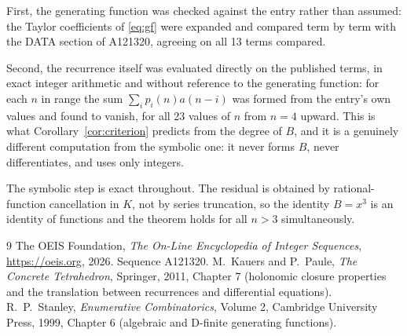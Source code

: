 \documentclass[11pt,a4paper]{article}
\theoremstyle{plain}
\theoremstyle{definition}
\begin{document}
First, the generating function was checked against the entry rather than assumed: the
Taylor coefficients of \eqref{eq:gf} were expanded and compared term by term with the DATA
section of A121320, agreeing on all 13 terms compared.

Second, the recurrence itself was evaluated directly on the published terms, in exact
integer arithmetic and without reference to the generating function: for each $n$ in range
the sum $\sum_{i}p_{i}(n)a(n-i)$ was formed from the entry's own values and found to
vanish, for all 23 values of $n$ from $n=4$ upward. This is what
Corollary~\ref{cor:criterion} predicts from the degree of $B$, and it is a genuinely
different computation from the symbolic one: it never forms $B$, never differentiates, and
uses only integers.

The symbolic step is exact throughout. The residual is obtained by rational-function
cancellation in $K$, not by series truncation, so the identity $B=x^{3}$ is an
identity of functions and the theorem holds for all $n>3$ simultaneously.

\begin{thebibliography}{9}
 The OEIS Foundation, \emph{The On-Line Encyclopedia of Integer Sequences},
\url{https://oeis.org}, 2026. Sequence A121320.
 M.~Kauers and P.~Paule, \emph{The Concrete Tetrahedron}, Springer, 2011,
Chapter 7 (holonomic closure properties and the translation between recurrences and
differential equations).
 R.~P.~Stanley, \emph{Enumerative Combinatorics}, Volume 2, Cambridge
University Press, 1999, Chapter 6 (algebraic and D-finite generating functions).
\end{thebibliography}
\end{document}
